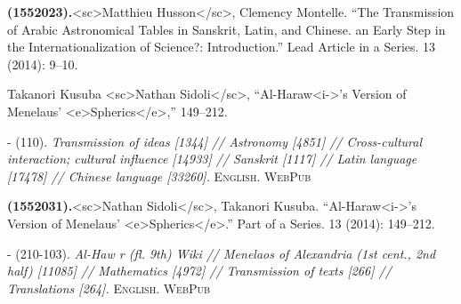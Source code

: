 \documentclass[12pt,onecolumn]{article}
\begin{document}
\noindent

\twocolumn
\mainmatter
\pagestyle{fancy} \lhead[\thepage]{} \chead[\thesection\
\leftmark]{\thesection\  \leftmark} \rhead[]{\thepage} \lfoot[]{}
\cfoot[]{} \rfoot[]{}




\noindent\begin{footnotesize}\textbf{ (1552023).}\hspace{0.5em}<sc>Matthieu Husson</sc>, Clemency Montelle. ``The Transmission of Arabic Astronomical Tables in Sanskrit, Latin, and Chinese. an Early Step in the Internationalization of Science?: Introduction.'' Lead Article in a Series.  13 (2014): 9--10.\begin{isisdescription} Takanori Kusuba <sc>Nathan Sidoli</sc>, ``Al-Haraw<i->'s Version of Menelaus' <e>Spherics</e>,'' 149--212.\end{isisdescription}



 \noindent \textsc{ -  (110).} \textit{Transmission of ideas [1344] // Astronomy [4851] // Cross-cultural interaction; cultural influence [14933] // Sanskrit [1117] // Latin language [17478] // Chinese language [33260].} \textsc{English. WebPub}

\vspace{2ex} \end{footnotesize}

\noindent\begin{footnotesize}\textbf{ (1552031).}\hspace{0.5em}<sc>Nathan Sidoli</sc>, Takanori Kusuba. ``Al-Haraw<i->'s Version of Menelaus' <e>Spherics</e>.'' Part of a Series.  13 (2014): 149--212.

 \noindent \textsc{ -  (210-103).} \textit{Al-Haw r (fl. 9th) {Wiki} // Menelaos of Alexandria (1st cent., 2nd half) [11085] // Mathematics [4972] // Transmission of texts [266] // Translations [264].} \textsc{English. WebPub}

\vspace{2ex} \end{footnotesize}%
\backmatter
\pagestyle{fancy}
\lhead[\thepage]{}
\chead[\leftmark  \rightmark]{\leftmark   \rightmark}
\rhead[]{\thepage}
\lfoot[]{}
\cfoot[]{}
\rfoot[]{}
\end{document}
